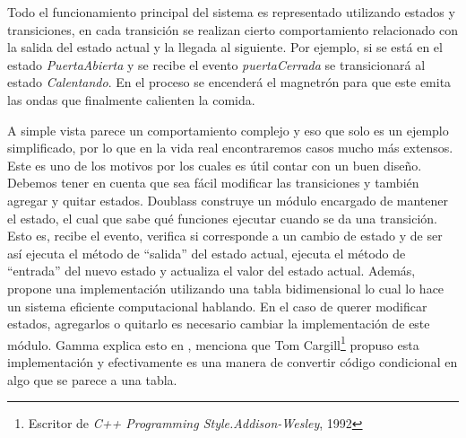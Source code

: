 Todo el funcionamiento principal del sistema es representado utilizando estados y transiciones, en cada transición se realizan cierto comportamiento relacionado con la salida del estado actual y la llegada al siguiente. Por ejemplo, si se está en el estado \textit{PuertaAbierta} y se recibe el evento \textit{puertaCerrada} se transicionará al estado \textit{Calentando}. En el proceso se encenderá el magnetrón para que este emita las ondas que finalmente calienten la comida.

A simple vista parece un comportamiento complejo y eso que solo es un ejemplo simplificado, por lo que en la vida real encontraremos casos mucho más extensos. Este es uno de los motivos por los cuales es útil contar con un buen diseño. Debemos tener en cuenta que sea fácil modificar las transiciones y también agregar y quitar estados. Doublass construye un módulo encargado de mantener el estado, el cual que sabe qué funciones ejecutar cuando se da una transición. Esto es, recibe el evento, verifica si corresponde a un cambio de estado y de ser así ejecuta el método de ``salida'' del estado actual, ejecuta el método de ``entrada'' del nuevo estado y actualiza el valor del estado actual. Además, propone una implementación utilizando una tabla bidimensional lo cual lo hace un sistema eficiente computacional hablando. En el caso de querer modificar estados, agregarlos o quitarlo es necesario cambiar la implementación de este módulo. Gamma explica esto en \cite[State]{Gamma:1995:DPE:186897}, menciona que Tom Cargill\footnote{Escritor de \textit{C++ Programming Style.Addison-Wesley}, 1992} propuso esta implementación y efectivamente es una manera de convertir código condicional en algo que se parece a una tabla.

